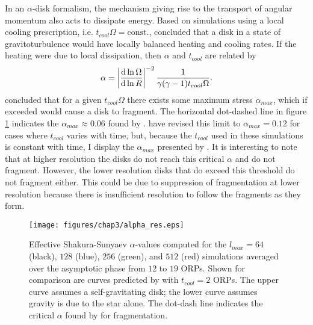 In an $\alpha$-disk formalism, the mechanism giving rise to the transport of angular momentum also acts to dissipate energy. Based on simulations using a local cooling prescription, i.e. $t_{cool} \Omega = \mathrm{const.}$, \citet{lodato2005} concluded that a disk in a state of gravitoturbulence would have locally balanced heating and cooling rates. If the heating were due to local dissipation, then $\alpha$ and $t_{cool}$ are related by
\begin{equation}\label{eq:IC:alphatcool}
\alpha = \left | \frac{\mathrm{d} \ln \Omega}{\mathrm{d} \ln R}\right|^{-2} \frac{1}{\gamma (\gamma -1) t_{cool} \Omega}.
\end{equation}
\citet{rice2005} concluded that for a given $t_{cool} \Omega$ there exists some maximum stress  $\alpha_{max}$, which if exceeded would cause a disk to fragment. The horizontal dot-dashed line in figure \ref{fig:IC:alphares} indicates the $\alpha_{max} \approx 0.06$ found by \citet{rice2005}.  \citet{clarke2007} have revised this limit to $\alpha_{max} = 0.12$ for cases where $t_{cool}$ varies with time, but, because the $t_{cool}$ used in these simulations is constant with time, I display the $\alpha_{max}$ presented by \citeauthor{rice2005}. It is interesting to note that at higher resolution the disks do not reach this critical $\alpha$ and do not fragment. However, the lower resolution disks that do exceed this threshold do not fragment either. This could be due to suppression of fragmentation at lower resolution because there is insufficient resolution to follow the fragments as they form.

\begin{figure}[p]
\centering
\texttt{[image: figures/chap3/alpha\_res.eps]}
\caption[Comparison of $\alpha$ profiles for varying azimuthal resolution]{Effective Shakura-Sunyaev $\alpha$-values computed for the $l_{max} = 64$ (black), $128$ (blue), $256$ (green), and $512$ (red) simulations averaged over the asymptotic phase from $12$ to $19$ ORPs. Shown for comparison are curves predicted by \citeauthor{gammie2001} with $t_{cool} = 2$ ORPs. The upper curve assumes a self-gravitating disk; the lower curve assumes gravity is due to the star alone. The dot-dash line indicates the critical $\alpha$ found by \citet{rice2005} for fragmentation.}
\label{fig:IC:alphares}
\end{figure}

